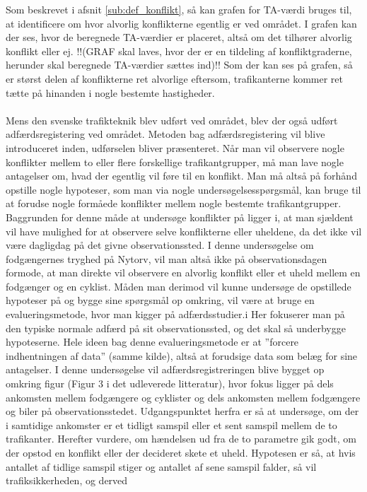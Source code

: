 Som beskrevet i afsnit \cref{sub:def_konflikt}, så kan grafen for TA-værdi bruges til, at identificere om hvor alvorlig konflikterne egentlig er ved området. I grafen kan der ses, hvor de beregnede TA-værdier er placeret, altså om det tilhører alvorlig konflikt eller ej.
!!(GRAF skal laves, hvor der er en tildeling af konfliktgraderne, herunder skal beregnede TA-værdier sættes ind)!!
Som der kan ses på grafen, så er størst delen af konflikterne ret alvorlige eftersom, trafikanterne kommer ret tætte på hinanden i nogle bestemte hastigheder.
\\\\
Mens den svenske trafikteknik blev udført ved området, blev der også udført adfærdsregistering ved området. Metoden bag adfærdsregistering vil blive introduceret inden, udførselen bliver præsenteret.
Når	man	vil	observere	nogle	konflikter	mellem	to	eller	flere	forskellige trafikantgrupper,	må	man	lave	nogle	antagelser	om,	hvad	der	egentlig	vil	føre	til	en konflikt.	Man	må	altså	på	forhånd	opstille	nogle	hypoteser,	som	man	via	nogle undersøgelsesspørgsmål,	kan	bruge	til	at	forudse	nogle	formåede	konflikter	mellem nogle	bestemte	trafikantgrupper.	Baggrunden	for	denne	måde	at	undersøge konflikter	på ligger	i,	at	man	sjældent	vil	have	mulighed	for	at	observere	selve konflikterne	eller	uheldene,	da	det	ikke	vil	være	dagligdag	på	det	givne observationssted.	I	denne	undersøgelse	om	fodgængernes	tryghed	på	Nytorv,	vil man altså	ikke	på	observationsdagen	formode,	at	man direkte	vil	observere en alvorlig	konflikt	eller	et	uheld	mellem	en	fodgænger	og	en	cyklist.	Måden	man derimod	vil	kunne	undersøge	de	opstillede	hypoteser	på	og	bygge	sine	spørgsmål	op omkring,	vil	være	at	bruge	en	evalueringsmetode,	hvor	man	kigger	på adfærdsstudier.i Her	fokuserer	man	på	den	typiske	normale	adfærd	på	sit observationssted, og	det	skal	så	underbygge	hypoteserne. Hele	ideen	bag	denne evalueringsmetode	er	at	”forcere indhentningen	af	data”	(samme	kilde),	altså	at forudsige	data	som	belæg	for	sine	antagelser.
I	denne	undersøgelse	vil	adfærdsregistreringen	blive	bygget	op	omkring	figur	(Figur
3	i	det	udleverede	litteratur),	hvor	fokus	ligger	på	dels	ankomsten	mellem
fodgængere	og	cyklister	og	dels	ankomsten	mellem	fodgængere	og	biler på
observationsstedet. Udgangspunktet	herfra	er	så	at	undersøge,	om	der	i	samtidige
ankomster	er	et	tidligt	samspil	eller	et	sent	samspil	mellem	de	to	trafikanter.
Herefter	vurdere,	om	hændelsen ud	fra	de	to	parametre	gik	godt,	om	der	opstod	en
konflikt	eller	der	decideret	skete	et	uheld.	Hypotesen	er	så,	at	hvis	antallet	af	tidlige
samspil	stiger	og	antallet	af	sene	samspil	falder,	så	vil	trafiksikkerheden,	og	derved
